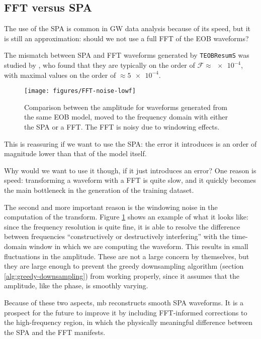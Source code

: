 \documentclass[main.tex]{subfiles}
\begin{document}
\subsection{FFT versus SPA}

The use of the \ac{SPA} is common in \ac{GW} data analysis because of its speed, but it is still an approximation: should we not use a full \ac{FFT} of the \ac{EOB} waveforms? 

The mismatch between \ac{SPA} and \ac{FFT} waveforms generated by \texttt{TEOBResumS} was studied by \textcite{gambaFastFaithfulFrequencydomain2020}, who found that they are typically on the order of \(\mathcal{F} \approx \num{e-4}\), with maximal values on the order of \(\approx \num{5e-4}\).

\begin{figure}[ht]
\centering
\texttt{[image: figures/FFT-noise-lowf]}
\caption{Comparison between the amplitude for waveforms generated from the same \ac{EOB} model, moved to the frequency domain with either the \ac{SPA} or a \ac{FFT}. The \ac{FFT} is noisy due to windowing effects.}
\label{fig:FFT-noise-lowf}
\end{figure}

This is reassuring if we want to use the \ac{SPA}: the error it introduces is an order of magnitude lower than that of the model itself. 

Why would we want to use it though, if it just introduces an error?
One reason is speed: transforming a waveform with a \ac{FFT} is quite slow, and it quickly becomes the main bottleneck in the generation of the training dataset.

The second and more important reason is the windowing noise in the computation of the transform.
Figure \ref{fig:FFT-noise-lowf} shows an example of what it looks like: since the frequency resolution is quite fine, it is able to resolve the difference between frequencies ``constructively or destructively interfering'' with the time-domain window in which we are computing the waveform. 
This results in small fluctuations in the amplitude. These are not a large concern by themselves, but they are large enough to prevent the greedy downsampling algorithm (section \ref{alg:greedy-downsampling}) from working properly, since it assumes that the amplitude, like the phase, is smoothly varying. 

Because of these two aspects, \ac{mb} reconstructs smooth \ac{SPA} waveforms. It is a prospect for the future to improve it by including \ac{FFT}-informed corrections to the high-frequency region, in which the physically meaningful difference between the \ac{SPA} and the \ac{FFT} manifests. 
\end{document}
